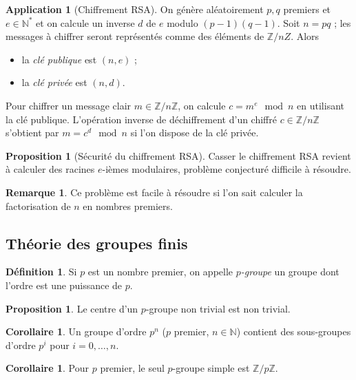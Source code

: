 \documentclass[a5paper, 10pt]{article}
\theoremstyle{definition}
\newtheorem{definition}[equation]{Définition}
\newtheorem{proposition}[equation]{Proposition}
\newtheorem{application}[equation]{Application}
\newtheorem{remark}[equation]{Remarque}
\newtheorem{corollary}[equation]{Corollaire}
\newcounter{n}
\def\Z{\mathbb{Z}}
\def\N{\mathbb{N}}
\begin{document}
\begin{application}[Chiffrement RSA]
  On génère aléatoirement $p, q$ premiers et $e \in \N^*$ et on
  calcule un inverse $d$ de $e$ modulo $(p-1)(q-1)$. Soit $n = pq$ ;
  les messages à chiffrer seront représentés comme des éléments de
  $\Z/nZ$. Alors
  \begin{itemize}
  \item la \emph{clé publique} est $(n,e)$ ;
  \item la \emph{clé privée} est $(n,d)$.
  \end{itemize}
  Pour chiffrer un message clair $m \in \Z/n\Z$, on calcule
  $c = m^e \mod n$ en utilisant la clé publique. L'opération inverse
  de déchiffrement d'un chiffré $c \in \Z/n\Z$ s'obtient par
  $m = c^d \mod n$ si l'on dispose de la clé privée.
\end{application}

\begin{proposition}[Sécurité du chiffrement RSA]
  Casser le chiffrement RSA revient à calculer des racines $e$-ièmes
  modulaires, problème conjecturé difficile à résoudre.
\end{proposition}
\begin{remark}
  Ce problème est facile à résoudre si l'on sait calculer la
  factorisation de $n$ en nombres premiers.
\end{remark}

\subsection{Théorie des groupes finis}

\begin{definition}
  Si $p$ est un nombre premier, on appelle \emph{$p$-groupe} un groupe
  dont l'ordre est une puissance de $p$.
\end{definition}
\begin{proposition}
  Le centre d'un $p$-groupe non trivial est non trivial.
\end{proposition}
\begin{corollary}
  Un groupe d'ordre $p^n$ ($p$ premier, $n \in \N$) contient des
  sous-groupes d'ordre $p^i$ pour $i = 0, \ldots, n$.
\end{corollary}
\begin{corollary}
  Pour $p$ premier, le seul $p$-groupe simple est $\Z/p\Z$.
\end{corollary}
\end{document}
